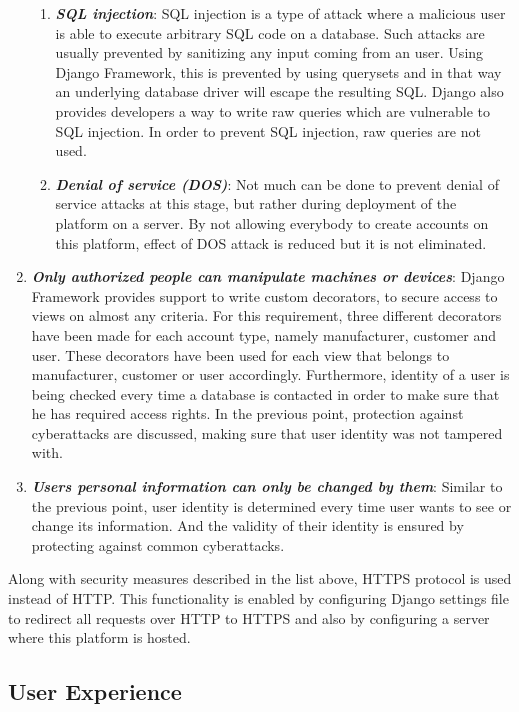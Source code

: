 \begin{enumerate}
\begin{enumerate}
		\item \textbf{\textit{SQL injection}}: SQL injection is a type of attack where a malicious user is able to execute arbitrary SQL code on a database. Such attacks are usually prevented by sanitizing any input coming from an user. Using Django Framework, this is prevented by using querysets and in that way an underlying database driver will escape the resulting SQL. Django also provides developers a way to write raw queries which are vulnerable to SQL injection. In order to prevent SQL injection, raw queries are not used.

		\item \textbf{\textit{Denial of service (DOS)}}: Not much can be done to prevent denial of service attacks at this stage, but rather during deployment of the platform on a server. By not allowing everybody to create accounts on this platform, effect of DOS attack is reduced but it is not eliminated.
		\end{enumerate}

	\item \textbf{\textit{Only authorized people can manipulate machines or devices}}: Django Framework provides support to write custom decorators, to secure access to views on almost any criteria. For this requirement, three different decorators have been made for each account type, namely manufacturer, customer and user. These decorators have been used for each view that belongs to manufacturer, customer or user accordingly. Furthermore, identity of a user is being checked every time a database is contacted in order to make sure that he has required access rights. In the previous point, protection against cyberattacks are discussed, making sure that user identity was not tampered with.

	\item \textbf{\textit{Users personal information can only be changed by them}}: Similar to the previous point, user identity is determined every time user wants to see or change its information. And the validity of their identity is ensured by protecting against common cyberattacks.
\end{enumerate}

Along with security measures described in the list above, HTTPS protocol is used instead of HTTP. This functionality is enabled by configuring Django settings file to redirect all requests over HTTP to HTTPS and also by configuring a server where this platform is hosted.

\subsection{User Experience}

